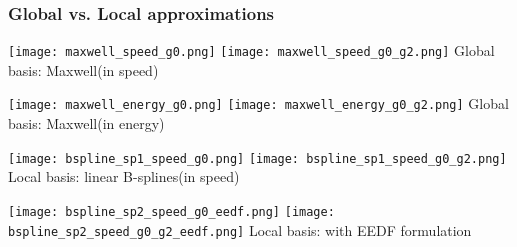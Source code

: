 \documentclass[landscape,archE,fontscale=0.285]{baposter} %
\begin{document}
\begin{poster}
{\begin{multicols}{2}
\subsubsection*{Global vs. Local approximations}
\begin{center}
  \texttt{[image: maxwell\_speed\_g0.png]}
  \texttt{[image: maxwell\_speed\_g0\_g2.png]}  
  \footnotesize{Global basis: Maxwell(in speed)}
\end{center}
\begin{center}
  \texttt{[image: maxwell\_energy\_g0.png]} 
  \texttt{[image: maxwell\_energy\_g0\_g2.png]}
  \footnotesize{Global basis: Maxwell(in energy)}
\end{center}

\begin{center}
  \texttt{[image: bspline\_sp1\_speed\_g0.png]} 
  \texttt{[image: bspline\_sp1\_speed\_g0\_g2.png]}
  \footnotesize{Local basis: linear B-splines(in speed)}
\end{center}
\columnbreak

\begin{center}
  \texttt{[image: bspline\_sp2\_speed\_g0\_eedf.png]} 
  \texttt{[image: bspline\_sp2\_speed\_g0\_g2\_eedf.png]} 
  \footnotesize{Local basis: with EEDF formulation}
\end{center}


\end{multicols}}
\end{poster}
\end{document}
